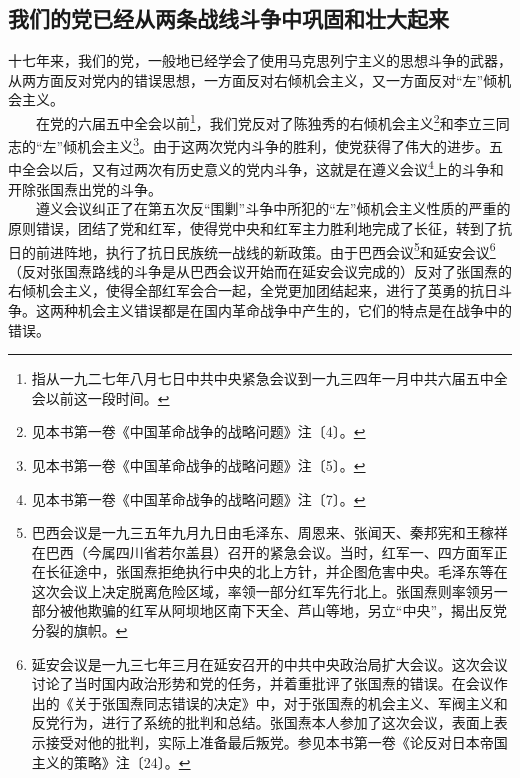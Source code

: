 \documentclass[cn,11pt,chinese]{elegantbook}
\def\myformat#1{\hfil\hfil #1}
\begin{document}
\subsection*{\myformat{我们的党已经从两条战线斗争中巩固和壮大起来}}
十七年来，我们的党，一般地已经学会了使用马克思列宁主义的思想斗争的武器，从两方面反对党内的错误思想，一方面反对右倾机会主义，又一方面反对“左”倾机会主义。\\
　　在党的六届五中全会以前\footnote[5]{ 指从一九二七年八月七日中共中央紧急会议到一九三四年一月中共六届五中全会以前这一段时间。}，我们党反对了陈独秀的右倾机会主义\footnote[6]{ 见本书第一卷《中国革命战争的战略问题》注〔4〕。}和李立三同志的“左”倾机会主义\footnote[7]{ 见本书第一卷《中国革命战争的战略问题》注〔5〕。}。由于这两次党内斗争的胜利，使党获得了伟大的进步。五中全会以后，又有过两次有历史意义的党内斗争，这就是在遵义会议\footnote[8]{ 见本书第一卷《中国革命战争的战略问题》注〔7〕。}上的斗争和开除张国焘出党的斗争。\\
　　遵义会议纠正了在第五次反“围剿”斗争中所犯的“左”倾机会主义性质的严重的原则错误，团结了党和红军，使得党中央和红军主力胜利地完成了长征，转到了抗日的前进阵地，执行了抗日民族统一战线的新政策。由于巴西会议\footnote[9]{ 巴西会议是一九三五年九月九日由毛泽东、周恩来、张闻天、秦邦宪和王稼祥在巴西（今属四川省若尔盖县）召开的紧急会议。当时，红军一、四方面军正在长征途中，张国焘拒绝执行中央的北上方针，并企图危害中央。毛泽东等在这次会议上决定脱离危险区域，率领一部分红军先行北上。张国焘则率领另一部分被他欺骗的红军从阿坝地区南下天全、芦山等地，另立“中央”，揭出反党分裂的旗帜。}和延安会议\footnote[10]{ 延安会议是一九三七年三月在延安召开的中共中央政治局扩大会议。这次会议讨论了当时国内政治形势和党的任务，并着重批评了张国焘的错误。在会议作出的《关于张国焘同志错误的决定》中，对于张国焘的机会主义、军阀主义和反党行为，进行了系统的批判和总结。张国焘本人参加了这次会议，表面上表示接受对他的批判，实际上准备最后叛党。参见本书第一卷《论反对日本帝国主义的策略》注〔24〕。}（反对张国焘路线的斗争是从巴西会议开始而在延安会议完成的）反对了张国焘的右倾机会主义，使得全部红军会合一起，全党更加团结起来，进行了英勇的抗日斗争。这两种机会主义错误都是在国内革命战争中产生的，它们的特点是在战争中的错误。\\
\end{document}
